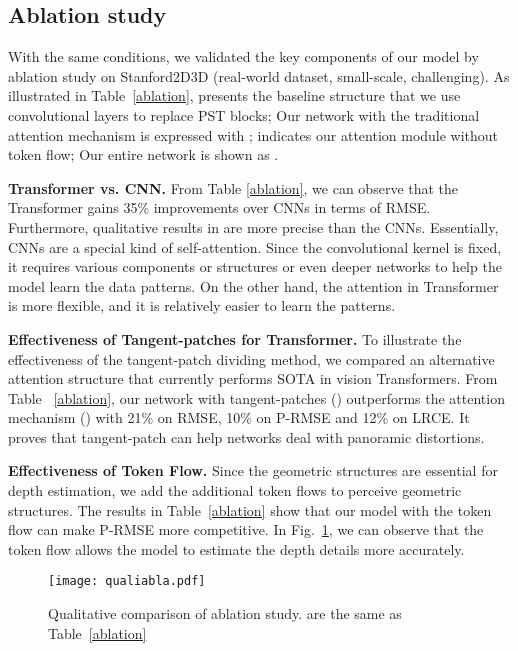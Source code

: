 \documentclass[runningheads]{llncs}
\begin{document}
\subsection{Ablation study}
With the same conditions, we validated the key components of our model by ablation study on Stanford2D3D (real-world dataset, small-scale, challenging). As illustrated in Table~\ref{ablation},  presents the baseline structure that we use convolutional layers to replace PST blocks; Our network with the traditional attention mechanism is expressed with ;  indicates our attention module without token flow; Our entire network is shown as .

\noindent \textbf{Transformer vs. CNN.}
From Table \ref{ablation}, we can observe that the Transformer gains 35\% improvements over CNNs in terms of RMSE. Furthermore, qualitative results in  are more precise than the CNNs. Essentially, CNNs are a special kind of self-attention. Since the convolutional kernel is fixed, it requires various components or structures or even deeper networks to help the model learn the data patterns. On the other hand, the attention in Transformer is more flexible, and it is relatively easier to learn the patterns.

\noindent \textbf{Effectiveness of Tangent-patches for Transformer.} 
To illustrate the effectiveness of the tangent-patch dividing method, we compared an alternative attention structure that currently performs SOTA in vision Transformers. From Table ~\ref{ablation}, our network with tangent-patches () outperforms the attention mechanism () with 21\% on RMSE, 10\% on P-RMSE and 12\% on LRCE. It proves that tangent-patch can help networks deal with panoramic distortions. 

\noindent \textbf{Effectiveness of Token Flow.} Since the geometric structures are essential for depth estimation, we add the additional token flows to perceive geometric structures. The results in Table~\ref{ablation} show that our model with the token flow can make P-RMSE more competitive. In Fig.~\ref{fig:ab}, we can observe that the token flow allows the model to estimate the depth details more accurately.
\begin{figure}[t]
  \centering
  \texttt{[image: qualiabla.pdf]} \caption{Qualitative comparison of ablation study.  are the same as Table~\ref{ablation}} \label{fig:ab}
\end{figure}
\end{document}
